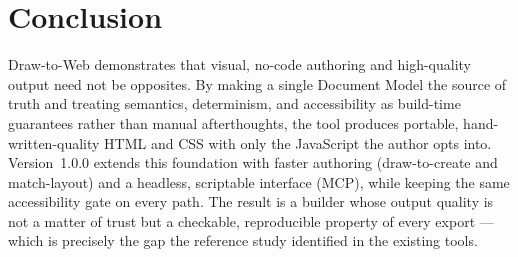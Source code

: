 \section{Conclusion}
Draw-to-Web demonstrates that visual, no-code authoring and high-quality output
need not be opposites. By making a single Document Model the source of truth and
treating semantics, determinism, and accessibility as build-time guarantees rather
than manual afterthoughts, the tool produces portable, hand-written-quality
HTML and CSS with only the JavaScript the author opts into. Version~1.0.0 extends
this foundation with faster authoring (draw-to-create and match-layout) and a
headless, scriptable interface (MCP), while keeping the same accessibility gate on
every path. The result is a builder whose output quality is not a matter of trust
but a checkable, reproducible property of every export --- which is precisely the
gap the reference study identified in the existing tools.
